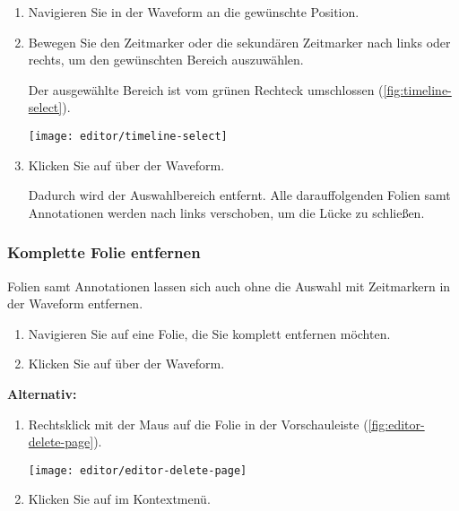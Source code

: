 \begin{enumerate}
	\item Navigieren Sie in der Waveform an die gewünschte Position.
	\item Bewegen Sie den Zeitmarker \editorslider{} oder die sekundären Zeitmarker \editorsecondarysliderleft{}\editorsecondarysliderright{} nach links oder rechts, um den gewünschten Bereich auszuwählen.

	Der ausgewählte Bereich ist vom grünen Rechteck umschlossen (\autoref{fig:timeline-select}).

	\begin{minipage}{0.9\textwidth}
		\centering
		\captionsetup{type=figure}
		\texttt{[image: editor/timeline-select]}
		\label{fig:timeline-select}
	\end{minipage}

	\item Klicken Sie auf  \editorcut{} über der Waveform.
	
	Dadurch wird der Auswahlbereich entfernt. Alle darauffolgenden Folien samt Annotationen werden nach links verschoben, um die Lücke zu schließen.
\end{enumerate}

\subsubsection{Komplette Folie entfernen}
Folien samt Annotationen lassen sich auch ohne die Auswahl mit Zeitmarkern in der Waveform entfernen.

\begin{enumerate}
	\item Navigieren Sie auf eine Folie, die Sie komplett entfernen möchten.
	\item Klicken Sie auf  \editorcutpage{} über der Waveform.
\end{enumerate}

\textbf{Alternativ:}

\begin{enumerate}
	\item Rechtsklick mit der Maus auf die Folie in der Vorschauleiste (\autoref{fig:editor-delete-page}).
	
	\begin{minipage}{0.9\textwidth}
		\centering
		\captionsetup{type=figure}
		\texttt{[image: editor/editor-delete-page]}
		\label{fig:editor-delete-page}
	\end{minipage}

	\item Klicken Sie auf  im Kontextmenü.
\end{enumerate}


